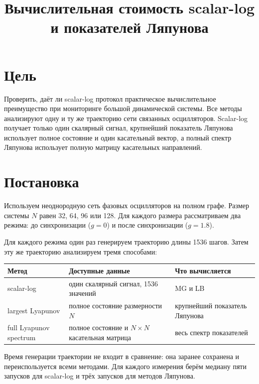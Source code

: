 \documentclass[10pt,a4paper]{article}
\author{}\date{}
\title{Вычислительная стоимость scalar-log и показателей Ляпунова}
\begin{document}
\maketitle

\section*{Цель}

Проверить, даёт ли scalar-log протокол практическое вычислительное преимущество при мониторинге большой динамической системы. Все методы анализируют одну и ту же траекторию сети связанных осцилляторов. Scalar-log получает только один скалярный сигнал, крупнейший показатель Ляпунова использует полное состояние и один касательный вектор, а полный спектр Ляпунова использует полную матрицу касательных направлений.

\section*{Постановка}

Используем неоднородную сеть фазовых осцилляторов на полном графе. Размер системы $N$ равен 32, 64, 96 или 128. Для каждого размера рассматриваем два режима: до синхронизации ($g=0$) и после синхронизации ($g=1.8$).

Для каждого режима один раз генерируем траекторию длины 1536 шагов. Затем эту же траекторию анализируем тремя способами:

\begin{center}\small
\begin{tabularx}{\linewidth}{>{\raggedright\arraybackslash}X>{\raggedright\arraybackslash}X>{\raggedright\arraybackslash}X}
\toprule
Метод & Доступные данные & Что вычисляется \\
\midrule
scalar-log & один скалярный сигнал, 1536 значений & MG и LB \\
largest Lyapunov & полное состояние размерности $N$ & крупнейший показатель Ляпунова \\
full Lyapunov spectrum & полное состояние и $N\times N$ касательная матрица & весь спектр показателей \\
\bottomrule\end{tabularx}\end{center}

Время генерации траектории не входит в сравнение: она заранее сохранена и переиспользуется всеми методами. Для каждого измерения берём медиану пяти запусков для scalar-log и трёх запусков для методов Ляпунова.
\end{document}
